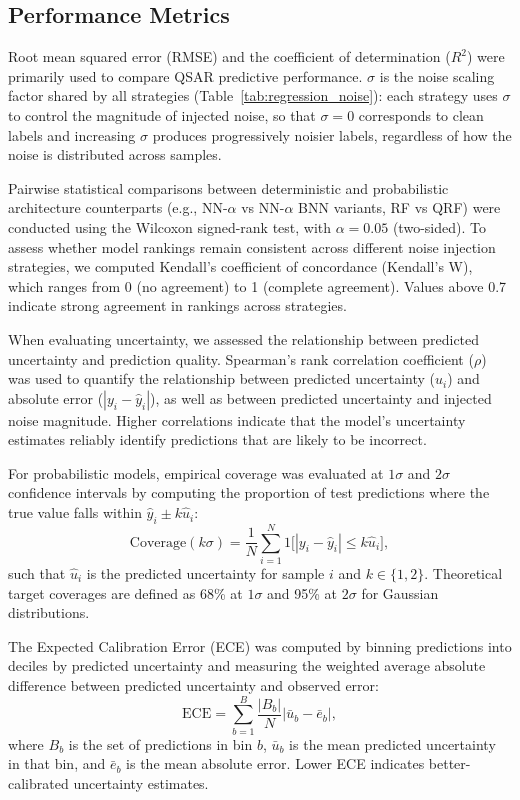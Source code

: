 \documentclass[pdflatex,sn-basic]{sn-jnl}%
\theoremstyle{thmstyleone}%
\theoremstyle{thmstyletwo}%
\theoremstyle{thmstylethree}%
\begin{document}
\subsection{Performance Metrics}

Root mean squared error (RMSE) and the coefficient of determination ($R^2$) were primarily used to compare QSAR predictive performance. $\sigma$ is the noise scaling factor shared by all strategies (Table~\ref{tab:regression_noise}): each strategy uses $\sigma$ to control the magnitude of injected noise, so that $\sigma = 0$ corresponds to clean labels and increasing $\sigma$ produces progressively noisier labels, regardless of how the noise is distributed across samples. 

Pairwise statistical comparisons between deterministic and probabilistic architecture counterparts (e.g., NN-$\alpha$ vs NN-$\alpha$ BNN variants, RF vs QRF) were conducted using the Wilcoxon signed-rank test, with $\alpha = 0.05$ (two-sided). To assess whether model rankings remain consistent across different noise injection strategies, we computed Kendall's coefficient of concordance (Kendall's W), which ranges from 0 (no agreement) to 1 (complete agreement). Values above 0.7 indicate strong agreement in rankings across strategies.

When evaluating uncertainty, we assessed the relationship between predicted uncertainty and prediction quality. Spearman's rank correlation coefficient ($\rho$) was used to quantify the relationship between predicted uncertainty ($u_i$) and absolute error ($|y_i - \hat{y}_i|$), as well as between predicted uncertainty and injected noise magnitude. Higher correlations indicate that the model's uncertainty estimates reliably identify predictions that are likely to be incorrect.

For probabilistic models, empirical coverage was evaluated at $1\sigma$ and $2\sigma$ confidence intervals by computing the proportion of test predictions where the true value falls within $\hat{y}_i \pm k\hat{u}_i$:
$$
\text{Coverage}(k\sigma) = \frac{1}{N}\sum_{i=1}^{N} 1\big[|y_i - \hat{y}_i| \leq k\hat{u}_i\big],
$$
such that $\hat{u}_i$ is the predicted uncertainty for sample $i$ and $k \in \{1, 2\}$. Theoretical target coverages are defined as 68\% at $1\sigma$ and 95\% at $2\sigma$ for Gaussian distributions.

The Expected Calibration Error (ECE) was computed by binning predictions into deciles by predicted uncertainty and measuring the weighted average absolute difference between predicted uncertainty and observed error:
$$
\text{ECE} = \sum_{b=1}^{B} \frac{|B_b|}{N} \big| \bar{u}_b - \bar{e}_b \big|,
$$
where $B_b$ is the set of predictions in bin $b$, $\bar{u}_b$ is the mean predicted uncertainty in that bin, and $\bar{e}_b$ is the mean absolute error. Lower ECE indicates better-calibrated uncertainty estimates.
\end{document}
